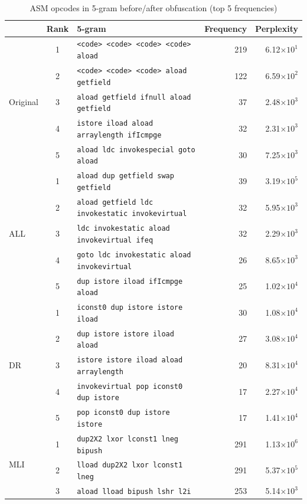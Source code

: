 \documentclass[conference]{IEEEtran}
\begin{document}
\begin{table}[t]
  \centering
  \caption{ASM opcodes in 5-gram before/after obfuscation (top 5 frequencies)}\label{table:5gram}
  {\footnotesize
  \begin{tabular}{lc|l|r|r}
    & \textbf{Rank} & \textbf{5-gram} & \textbf{Frequency} & \textbf{Perplexity} \\ \hline
\multirow{5}{*}{{Original}}
& 1 & \verb!<code> <code> <code> <code> aload       ! &  219 & 6.12$\times10^1$ \\
& 2 & \verb!<code> <code> <code> aload getfield     ! &  122 & 6.59$\times10^2$ \\
& 3 & \verb!aload getfield ifnull aload getfield    ! &   37 & 2.48$\times10^3$ \\
& 4 & \verb!istore iload aload arraylength ifIcmpge ! &   32 & 2.31$\times10^3$ \\
& 5 & \verb!aload ldc invokespecial goto aload      ! &   30 & 7.25$\times10^3$ \\ \hline
\multirow{5}{*}{{ALL}}
& 1 & \verb!aload dup getfield swap getfield              ! &  39 & 3.19$\times10^5$ \\
& 2 & \verb!aload getfield ldc invokestatic invokevirtual ! &  32 & 5.95$\times10^3$ \\
& 3 & \verb!ldc invokestatic aload invokevirtual ifeq     ! &  32 & 2.29$\times10^3$ \\
& 4 & \verb!goto ldc invokestatic aload invokevirtual     ! &  26 & 8.65$\times10^3$ \\
& 5 & \verb!dup istore iload ifIcmpge aload               ! &  25 & 1.02$\times10^4$ \\ \hline
\multirow{5}{*}{{DR}}
& 1 & \verb!iconst0 dup istore istore iload       ! & 30 & 1.08$\times10^4$ \\
& 2 & \verb!dup istore istore iload aload         ! & 27 & 3.08$\times10^4$ \\
& 3 & \verb!istore istore iload aload arraylength ! & 20 & 8.31$\times10^4$ \\
& 4 & \verb!invokevirtual pop iconst0 dup istore  ! & 17 & 2.27$\times10^4$ \\
& 5 & \verb!pop iconst0 dup istore istore         ! & 17 & 1.41$\times10^4$ \\ \hline
\multirow{5}{*}{{MLI}}
& 1 & \verb!dup2X2 lxor lconst1 lneg bipush ! & 291 & 1.13$\times10^6$ \\
& 2 & \verb!lload dup2X2 lxor lconst1 lneg  ! & 291 & 5.37$\times10^5$ \\
& 3 & \verb!aload lload bipush lshr l2i     ! & 253 & 5.14$\times10^3$ \\

\end{tabular}}
\end{table}
\end{document}
